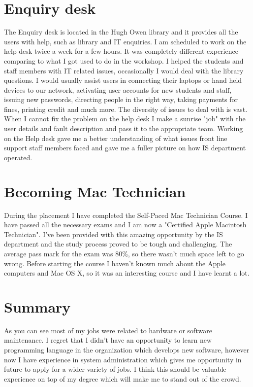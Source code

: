 \documentclass[10pt,a4paper,headinclude=true,twoside]{report}
\begin{document}
\section{Enquiry desk}
The Enquiry desk is located in the Hugh Owen library and it provides all the users with help, such as library and IT enquiries. I am scheduled to work on the help desk twice a week for a few hours. It was completely different experience comparing to what I got used to do in the workshop. I helped the students and staff members with IT related issues, occasionally I would deal with the library questions. I would usually assist users in connecting their laptops or hand held devices to our network, activating user accounts for new students and staff, issuing new passwords, directing people in the right way, taking payments for fines, printing credit and much more. The diversity of issues to deal with is vast. When I cannot fix the problem on the help desk I make a sunrise "job" with the user details and fault description and pass it to the appropriate team. Working on the Help desk gave me a better understanding of what issues front line support staff members faced and gave me a fuller picture on how IS department operated.
  
\section{Becoming Mac Technician}
During the placement I have completed the Self-Paced Mac Technician Course. I have passed all the necessary exams and I am now a "Certified Apple Macintosh Technician". I've been provided with this amazing opportunity by the IS department and the study process proved to be tough and challenging. The average pass mark for the exam was 80\%, so there wasn't much space left to go wrong. Before starting the course I haven't known much about the Apple computers and Mac OS X, so it was an interesting course and I have learnt a lot. 

\section{Summary}
As you can see most of my jobs were related to hardware or software maintenance. I regret that I didn't have an opportunity to learn new programming language in the organization which develops new software, however now I have experience in system administration which gives me opportunity in future to apply for a wider variety of jobs. I think this should be valuable experience on top of my degree which will make me to stand out of the crowd.
\end{document}

